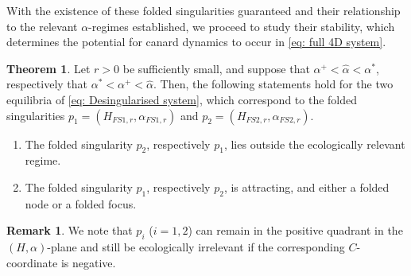 \documentclass{article}
\theoremstyle{definition}
\numberwithin{equation}{section}
\newtheorem{thm}[prop]{Theorem}
\newtheorem{remark}[prop]{Remark}
\begin{document}
With the existence of these folded singularities guaranteed and their relationship to the relevant $\alpha$-regimes established, we proceed to study their stability, which determines the potential for canard dynamics to occur in \eqref{eq: full 4D system}.

\begin{thm} Let $r>0$ be sufficiently small, and suppose that $\alpha^{+}<\hat\alpha<\alpha^\ast$, respectively that $\alpha^\ast<\alpha^{+}<\hat\alpha$. Then, the following statements hold for the two equilibria of \eqref{eq: Desingularised system}, which correspond to the folded singularities $p_1=(H_{FS1,r},\alpha_{FS1,r})$ and $p_2=(H_{FS2,r},\alpha_{FS2,r})$.
\begin{enumerate}
    \item The folded singularity $p_2$, respectively $p_1$, lies outside the ecologically relevant regime.
    \item The folded singularity $p_1$, respectively $p_2$, is attracting, and either a folded node or a folded focus. 
\end{enumerate} 
\label{thm: folded singularities}
\end{thm}
\begin{remark}
We note that $p_i$ ($i=1,2$) can remain in the positive quadrant in the $(H,\alpha)$-plane and still be ecologically irrelevant if the corresponding $C$-coordinate is negative.
\end{remark}
\end{document}
